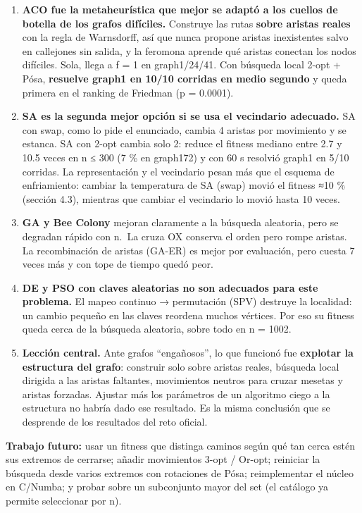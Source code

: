 \documentclass[
  spanish,
  12pt,
]{article}
\providecommand{\tightlist}{%
  \setlength{\itemsep}{0pt}\setlength{\parskip}{0pt}}
\begin{document}
\begin{enumerate}
\def\labelenumi{\arabic{enumi}.}
\tightlist
\item
  \textbf{ACO fue la metaheurística que mejor se adaptó a los cuellos de
  botella de los grafos difíciles.} Construye las rutas \textbf{sobre
  aristas reales} con la regla de Warnsdorff, así que nunca propone
  aristas inexistentes salvo en callejones sin salida, y la feromona
  aprende qué aristas conectan los nodos difíciles. Sola, llega a f = 1
  en graph1/24/41. Con búsqueda local 2-opt + Pósa, \textbf{resuelve
  graph1 en 10/10 corridas en medio segundo} y queda primera en el
  ranking de Friedman (p = 0.0001).
\item
  \textbf{SA es la segunda mejor opción si se usa el vecindario
  adecuado.} SA con swap, como lo pide el enunciado, cambia 4 aristas
  por movimiento y se estanca. SA con 2-opt cambia solo 2: reduce el
  fitness mediano entre 2.7 y 10.5 veces en n ≤ 300 (7 \% en graph172) y
  con 60 s resolvió graph1 en 5/10 corridas. La representación y el
  vecindario pesan más que el esquema de enfriamiento: cambiar la
  temperatura de SA (swap) movió el fitness ≈10 \% (sección 4.3),
  mientras que cambiar el vecindario lo movió hasta 10 veces.
\item
  \textbf{GA y Bee Colony} mejoran claramente a la búsqueda aleatoria,
  pero se degradan rápido con n.~La cruza OX conserva el orden pero
  rompe aristas. La recombinación de aristas (GA-ER) es mejor por
  evaluación, pero cuesta 7 veces más y con tope de tiempo quedó peor.
\item
  \textbf{DE y PSO con claves aleatorias no son adecuados para este
  problema.} El mapeo continuo → permutación (SPV) destruye la
  localidad: un cambio pequeño en las claves reordena muchos vértices.
  Por eso su fitness queda cerca de la búsqueda aleatoria, sobre todo en
  n = 1002.
\item
  \textbf{Lección central.} Ante grafos ``engañosos'', lo que funcionó
  fue \textbf{explotar la estructura del grafo}: construir solo sobre
  aristas reales, búsqueda local dirigida a las aristas faltantes,
  movimientos neutros para cruzar mesetas y aristas forzadas. Ajustar
  más los parámetros de un algoritmo ciego a la estructura no habría
  dado ese resultado. Es la misma conclusión que se desprende de los
  resultados del reto oficial.
\end{enumerate}

\textbf{Trabajo futuro:} usar un fitness que distinga caminos según qué
tan cerca estén sus extremos de cerrarse; añadir movimientos 3-opt /
Or-opt; reiniciar la búsqueda desde varios extremos con rotaciones de
Pósa; reimplementar el núcleo en C/Numba; y probar sobre un subconjunto
mayor del set (el catálogo ya permite seleccionar por n).
\end{document}
